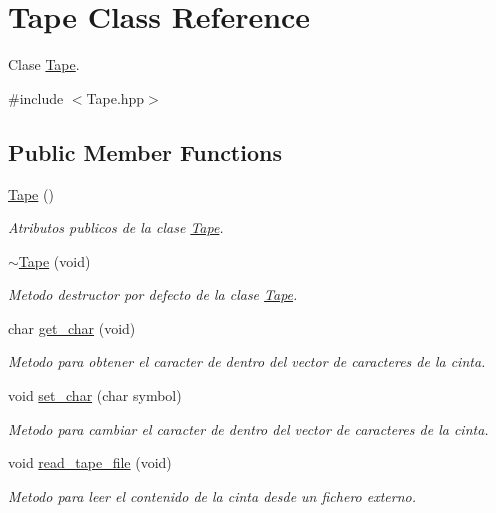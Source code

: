 \hypertarget{class_tape}{}\section{Tape Class Reference}
\label{class_tape}


Clase \hyperlink{class_tape}{Tape}.  




{\ttfamily \#include $<$Tape.\+hpp$>$}

\subsection*{Public Member Functions}
\begin{DoxyCompactItemize}
\item 
\hyperlink{class_tape_a18f34a19a5f5f1b9602a73696bfd7556}{Tape} ()
\begin{DoxyCompactList}\small\item\em Atributos publicos de la clase \hyperlink{class_tape}{Tape}. \end{DoxyCompactList}\item 
\hypertarget{class_tape_a8bb03038a0284874c27d7c5b6759ca43}{}\label{class_tape_a8bb03038a0284874c27d7c5b6759ca43} 
\hyperlink{class_tape_a8bb03038a0284874c27d7c5b6759ca43}{$\sim$\+Tape} (void)
\begin{DoxyCompactList}\small\item\em Metodo destructor por defecto de la clase \hyperlink{class_tape}{Tape}. \end{DoxyCompactList}\item 
char \hyperlink{class_tape_a6b31f4a92b882a2adf51b96d2b03c437}{get\+\_\+char} (void)
\begin{DoxyCompactList}\small\item\em Metodo para obtener el caracter de dentro del vector de caracteres de la cinta. \end{DoxyCompactList}\item 
void \hyperlink{class_tape_afd396547441cee62e2ea7d55650f8275}{set\+\_\+char} (char symbol)
\begin{DoxyCompactList}\small\item\em Metodo para cambiar el caracter de dentro del vector de caracteres de la cinta. \end{DoxyCompactList}\item 
void \hyperlink{class_tape_ab41614cfbca9b6f6544215f0cd467f6c}{read\+\_\+tape\+\_\+file} (void)
\begin{DoxyCompactList}\small\item\em Metodo para leer el contenido de la cinta desde un fichero externo. \end{DoxyCompactList}\item 

\end{DoxyCompactItemize}

